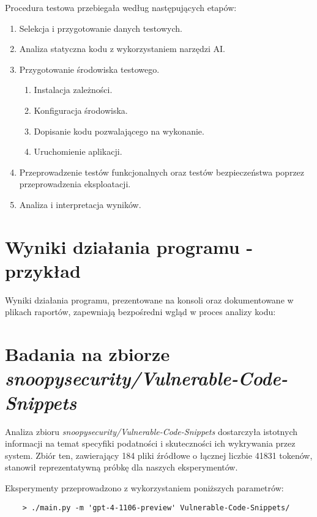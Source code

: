 Procedura testowa przebiegała według następujących etapów:
\begin{enumerate}
    \item Selekcja i przygotowanie danych testowych.
    \item Analiza statyczna kodu z wykorzystaniem narzędzi AI.
    \item Przygotowanie środowiska testowego.
    \begin{enumerate}
        \item Instalacja zależności.
        \item Konfiguracja środowiska.
        \item Dopisanie kodu pozwalającego na wykonanie.
        \item Uruchomienie aplikacji.
    \end{enumerate} 
    \item Przeprowadzenie testów funkcjonalnych oraz testów bezpieczeństwa poprzez przeprowadzenia eksploatacji.
    \item Analiza i interpretacja wyników.
\end{enumerate}

\section{Wyniki działania programu - przykład}
\label{sec:wyniki_dzialania_programu}

Wyniki działania programu, prezentowane na konsoli oraz dokumentowane w plikach raportów, zapewniają bezpośredni wgląd w proces analizy kodu:


\newpage
\section{Badania na zbiorze \textit{snoopysecurity/Vulnerable-Code-Snippets}}
\label{sec:badania_na_zbiorze_snoopysecurity}

Analiza zbioru \textit{snoopysecurity/Vulnerable-Code-Snippets} dostarczyła istotnych informacji na temat specyfiki podatności i skuteczności ich wykrywania przez system. Zbiór ten, zawierający 184 pliki źródłowe o łącznej liczbie 41831 tokenów, stanowił reprezentatywną próbkę dla naszych eksperymentów.

Eksperymenty przeprowadzono z wykorzystaniem poniższych parametrów:
\begin{verbatim}
    > ./main.py -m 'gpt-4-1106-preview' Vulnerable-Code-Snippets/
\end{verbatim}


